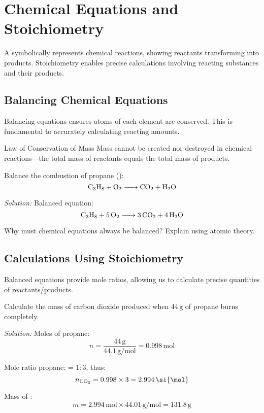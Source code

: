 \FloatBarrier

\section{Chemical Equations and Stoichiometry}
\FloatBarrier
\FloatBarrier
\FloatBarrier


A  symbolically represents chemical reactions, showing reactants transforming into products. Stoichiometry enables precise calculations involving reacting substances and their products.

\subsection{Balancing Chemical Equations}
\FloatBarrier
\FloatBarrier
\FloatBarrier

Balancing equations ensures atoms of each element are conserved. This is fundamental to accurately calculating reacting amounts.

\begin{keyconcept}{Law of Conservation of Mass}
Mass cannot be created nor destroyed in chemical reactions—the total mass of reactants equals the total mass of products.
\end{keyconcept}

\begin{example}
Balance the combustion of propane ():
\[
\ce{C3H8 + O2 -> CO2 + H2O}
\]

\textit{Solution:}
Balanced equation:
\[
\ce{C3H8 + 5O2 -> 3CO2 + 4H2O}
\]
\end{example}

\begin{stopandthink}
Why must chemical equations always be balanced? Explain using atomic theory.
\end{stopandthink}

\subsection{Calculations Using Stoichiometry}
\FloatBarrier
\FloatBarrier
\FloatBarrier

Balanced equations provide mole ratios, allowing us to calculate precise quantities of reactants/products.

\begin{example}
Calculate the mass of carbon dioxide produced when \(44\,\si{\gram}\) of propane burns completely.

\textit{Solution:}
Moles of propane:
\[
n = \frac{44\,\si{\gram}}{44.1\,\si{\gram\per\mol}} = 0.998\,\si{\mol}
\]

Mole ratio propane: = \(1:3\), thus:
\[
n_{\ce{CO2}} = 0.998 \times 3 = 2.994\,\si{\mol}
\]

Mass of :
\[
m = 2.994\,\si{\mol} \times 44.01\,\si{\gram\per\mol} = 131.8\,\si{\gram}
\]
\end{example}

